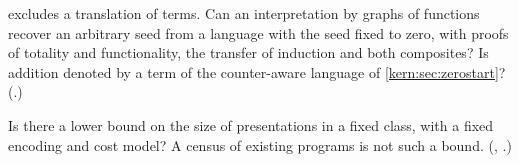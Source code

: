 \begin{question}
\label{kern:q:graph}
 excludes a translation of terms.  Can an
interpretation by graphs of functions recover an arbitrary seed from a
language with the seed fixed to zero, with proofs of totality and
functionality, the transfer of induction and both composites?  Is addition
denoted by a term of the counter-aware language of
\cref{kern:sec:zerostart}?  (.)
\end{question}

\begin{question}
\label{kern:q:lower}
Is there a lower bound on the size of presentations in a fixed class, with
a fixed encoding and cost model?  A census of existing programs is not such
a bound.  (, .)
\end{question}

